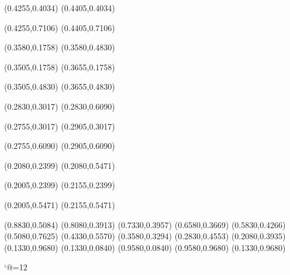 \PST@Solid(0.4255,0.4034)
(0.4405,0.4034)

\PST@Solid(0.4255,0.7106)
(0.4405,0.7106)

\PST@Solid(0.3580,0.1758)
(0.3580,0.4830)

\PST@Solid(0.3505,0.1758)
(0.3655,0.1758)

\PST@Solid(0.3505,0.4830)
(0.3655,0.4830)

\PST@Solid(0.2830,0.3017)
(0.2830,0.6090)

\PST@Solid(0.2755,0.3017)
(0.2905,0.3017)

\PST@Solid(0.2755,0.6090)
(0.2905,0.6090)

\PST@Solid(0.2080,0.2399)
(0.2080,0.5471)

\PST@Solid(0.2005,0.2399)
(0.2155,0.2399)

\PST@Solid(0.2005,0.5471)
(0.2155,0.5471)

\PST@Diamond(0.8830,0.5084)
\PST@Diamond(0.8080,0.3913)
\PST@Diamond(0.7330,0.3957)
\PST@Diamond(0.6580,0.3669)
\PST@Diamond(0.5830,0.4266)
\PST@Diamond(0.5080,0.7625)
\PST@Diamond(0.4330,0.5570)
\PST@Diamond(0.3580,0.3294)
\PST@Diamond(0.2830,0.4553)
\PST@Diamond(0.2080,0.3935)
\PST@Border(0.1330,0.9680)
(0.1330,0.0840)
(0.9580,0.0840)
(0.9580,0.9680)
(0.1330,0.9680)

\catcode`@=12
\fi
\endpspicture
